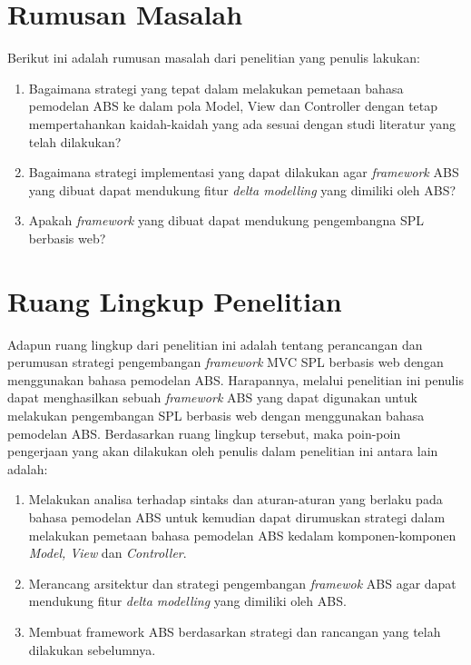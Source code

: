 \section{Rumusan Masalah}
\noindent
Berikut ini adalah rumusan masalah dari penelitian yang penulis lakukan:

\begin{enumerate}
    \item Bagaimana strategi yang tepat dalam melakukan pemetaan bahasa pemodelan ABS ke dalam pola Model, View dan Controller dengan tetap mempertahankan kaidah-kaidah yang ada sesuai dengan studi literatur yang telah dilakukan?
    \item Bagaimana strategi implementasi yang dapat dilakukan agar \textit{framework} ABS yang dibuat dapat mendukung fitur \textit{delta modelling} yang dimiliki oleh ABS?
    \item Apakah \textit{framework} yang dibuat dapat mendukung pengembangna SPL berbasis web?
\end{enumerate}

\section{Ruang Lingkup Penelitian}
\noindent
Adapun ruang lingkup dari penelitian ini adalah tentang perancangan dan perumusan strategi pengembangan \textit{framework} MVC SPL berbasis web dengan menggunakan bahasa pemodelan ABS. Harapannya, melalui penelitian ini penulis dapat menghasilkan sebuah \textit{framework} ABS yang dapat digunakan untuk melakukan pengembangan SPL berbasis web dengan menggunakan bahasa pemodelan ABS. Berdasarkan ruang lingkup tersebut, maka poin-poin pengerjaan yang akan dilakukan oleh penulis dalam penelitian ini antara lain adalah:

\begin{enumerate}
    \item Melakukan analisa terhadap sintaks dan aturan-aturan yang berlaku pada bahasa pemodelan ABS untuk kemudian dapat dirumuskan strategi dalam melakukan pemetaan bahasa pemodelan ABS kedalam komponen-komponen \textit{Model, View} dan \textit{Controller}.
    \item Merancang arsitektur dan strategi pengembangan \textit{framewok} ABS agar dapat mendukung fitur \textit{delta modelling} yang dimiliki oleh ABS.
    \item Membuat framework ABS berdasarkan strategi dan rancangan yang telah dilakukan sebelumnya.
\end{enumerate}

